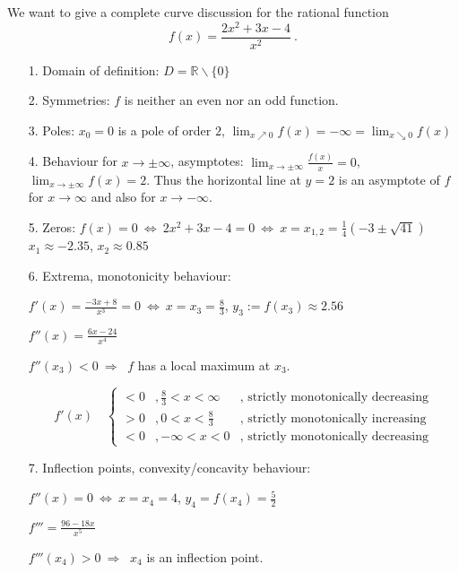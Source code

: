 \begin{example}
  We want to give a complete curve discussion for the rational function 
  $$f(x)=\frac{2x^2+3x-4}{x^2} \ .$$
\begin{enumerate}
    \item[1.] Domain of definition: $D=\mathbb{R}\backslash\{0\}$
 \item[2.] Symmetries: $f$ is neither an even nor an odd function.
 \item[3.] Poles: $x_0=0$ is a pole of order $2$, $\lim_{x\nearrow 0}f(x)=-\infty=\lim_{x\searrow 0}f(x)$
 \item[4.] Behaviour for $x\longrightarrow \pm\infty$, asymptotes:      
	     $\lim_{x\rightarrow\pm\infty}\frac{f(x)}{x} = 0$,
	     $\lim_{x\rightarrow\pm\infty} f(x) =2$.
            Thus the horizontal line at $y=2$ is an asymptote of $f$ for $x\longrightarrow \infty$  and also for $x\longrightarrow -\infty$.
 \item[5.] Zeros: $f(x)=0 \ \Leftrightarrow \ 2x^2+3x-4=0 \ \Leftrightarrow \  x=x_{1,2}=\frac{1}{4}(-3\pm\sqrt{41})$\\
            $x_1\approx-2.35$,  $x_2\approx 0.85$	    
 \item[6.] Extrema, monotonicity behaviour:
	    
            $f'(x)=\frac{-3x+8}{x^3}=0 \ \Leftrightarrow \ x=x_3= \frac{8}{3}$, $y_3:=f(x_3)\approx 2.56$

	    $f''(x)=\frac{6x-24}{x^4}$  
              
            $f''(x_3)<0 \ \Rightarrow \ $ $f$ has a local maximum at $x_3$.    

        \[ f'(x) \quad \left\{
 	\begin{array}{lll}
	  <0 &, \frac{8}{3} <x <\infty & \text{, strictly monotonically decreasing} \\
	  >0 &, 0<x<\frac{8}{3}        & \text{, strictly monotonically increasing} \\
	  <0 &, -\infty<x<0            & \text{, strictly monotonically decreasing} 
 	\end{array}
         \right.
         \]

 \item[7.] Inflection points, convexity/concavity behaviour:
      
      $f''(x)=0 \ \Leftrightarrow \  x=x_4=4$, $y_4=f(x_4)=\frac{5}{2}$

      $f'''=\frac{96-18x}{x^5}$ 

      $f'''(x_4)>0 \ \Rightarrow \ $ $x_4$ is an inflection point.



\end{enumerate}
\end{example}

